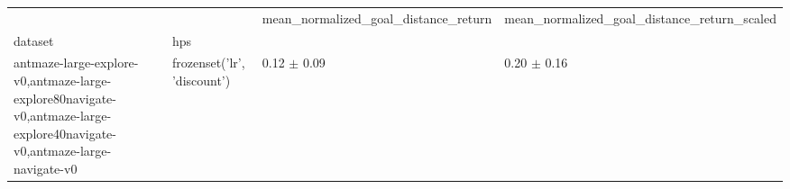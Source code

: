 \begin{tabular}{llll}
\toprule
 &  & mean_normalized_goal_distance_return & mean_normalized_goal_distance_return_scaled \\
dataset & hps &  &  \\
\midrule
antmaze-large-explore-v0,antmaze-large-explore80navigate-v0,antmaze-large-explore40navigate-v0,antmaze-large-navigate-v0 & frozenset({'lr', 'discount'}) & 0.12 $\pm$ 0.09 & 0.20 $\pm$ 0.16 \\
\cline{1-4}
\bottomrule
\end{tabular}
